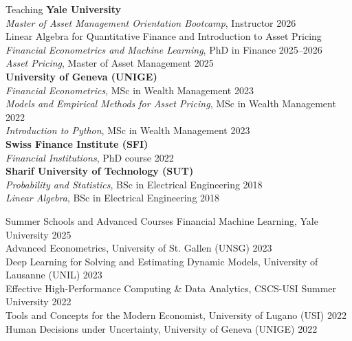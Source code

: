 \documentclass{resume}
\begin{document}
\begin{rSection}{Teaching}
\textbf{Yale University} \\
\textit{Master of Asset Management Orientation Bootcamp}, Instructor \hfill 2026 \\
Linear Algebra for Quantitative Finance and Introduction to Asset Pricing \\
\textit{Financial Econometrics and Machine Learning}, PhD in Finance \hfill 2025–2026 \\
\textit{Asset Pricing}, Master of Asset Management \hfill 2025 \\[-0.9em]

\textbf{University of Geneva (UNIGE)} \\
\textit{Financial Econometrics}, MSc in Wealth Management \hfill 2023 \\
\textit{Models and Empirical Methods for Asset Pricing}, MSc in Wealth Management \hfill 2022 \\
\textit{Introduction to Python}, MSc in Wealth Management \hfill 2023 \\[-0.9em]

\textbf{Swiss Finance Institute (SFI)} \\
\textit{Financial Institutions}, PhD course \hfill 2022 \\[-0.9em]

\textbf{Sharif University of Technology (SUT)} \\
\textit{Probability and Statistics}, BSc in Electrical Engineering \hfill 2018 \\
\textit{Linear Algebra}, BSc in Electrical Engineering \hfill 2018 
\end{rSection}

\begin{rSection}{Summer Schools and Advanced Courses}
Financial Machine Learning, Yale University \hfill {2025} \\
Advanced Econometrics, University of St. Gallen (UNSG) \hfill {2023} \\
Deep Learning for Solving and Estimating Dynamic Models, University of Lausanne (UNIL) \hfill {2023} \\
Effective High-Performance Computing \& Data Analytics, CSCS-USI Summer University \hfill {2022} \\
Tools and Concepts for the Modern Economist, University of Lugano (USI) \hfill {2022} \\
Human Decisions under Uncertainty, University of Geneva (UNIGE) \hfill {2022}
\end{rSection}
\end{document}
